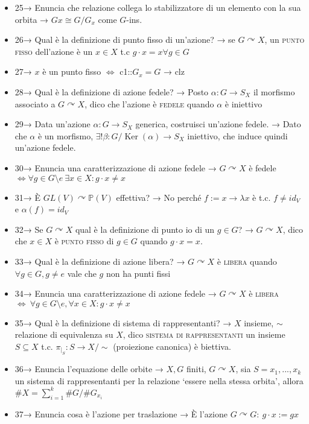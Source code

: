 \documentclass[A4,12pt]{article}
\newcommand{\acts}{\curvearrowright}
\newcommand{\Gins}{$ G $-ins.}
\renewcommand{\iff}{\Leftrightarrow}
\begin{document}
\begin{itemize}[noitemsep]
		\item 25→ Enuncia che relazione collega lo stabilizzatore di un elemento con la sua orbita → $ Gx \cong G/G_x $ come \Gins
		\item 26→ Qual è la definizione di punto fisso di un'azione? → se $G\acts X  $, un \textsc{punto fisso }dell'azione è un $ x\in X $ t.c $ g\cdot x = x \forall g\in G $
		\item 27→ $ x $ è un punto fisso $ \Leftrightarrow $ {{c1::$ G_x = G $ }}  → clz
		\item 28→ Qual è la definizione di azione fedele? → Posto $ \alpha:G \to S_X  $ il morfismo associato a $ G\acts X $, dico che l'azione è \textsc{fedele} quando $ \alpha $ è iniettivo
		\item 29→ Data un'azione $ \alpha :G\to S_X $ generica, costruisci un'azione fedele. → Dato che $ \alpha $ è un morfismo, $ \exists! \beta : G/\operatorname{Ker}(\alpha) \to S_X$ iniettivo, che induce quindi un'azione fedele.
		\item 30→ Enuncia una caratterizzazione di azione fedele → $ G\acts X $ è fedele $ \iff \forall g\in G\setminus{e}\ \exists x\in X : g\cdot x \neq x$
		\item 31→ È $ GL(V)\acts \mathbb{P}(V) $ effettiva? → No perché $ f := x\to\lambda x $ è t.c. $ f\neq id_V $ e $ \alpha(f) = id_V $
		\item 32→ Se $ G\acts X $ qual è la definizione di punto io di un $ g\in G $? → $ G\acts X $, dico che $ x\in X $ è \textsc{punto fisso} di $ g\in G $ quando $ g\cdot x = x $.
		\item 33→ Qual è la definizione di azione libera? → $ G\acts X $ è \textsc{libera} quando $ \forall g\in G, g\neq e$ vale che  $ g$ non ha punti fissi 
		\item 34→ Enuncia una caratterizzazione di azione fedele → $ G\acts X $ è \textsc{libera} $ \iff\ \forall g\in G\setminus{e}, \forall x\in X: g\cdot x \neq x $ 
		\item 35→ Qual è la definizione di sistema di rappresentanti? → $ X $ insieme, $ \sim  $ relazione di equivalenza su $ X $, dico \textsc{sistema di rappresentanti} un insieme $ S\subseteq X $ t.c. $ \pi_{|_{S}}:S\to X/\sim $ (proiezione canonica) è biettiva.
		\item 36→ Enuncia l'equazione delle orbite → $ X,G $ finiti, $ G\acts X $, sia $ S={x_1,...,x_k} $ un sistema di rappresentanti per la relazione \enquote*{essere nella stessa orbita}, allora $ \#X = \sum_{i=1}^k \#G/\#G_{x_i} $
		\item 37→ Enuncia cosa è l'azione per traslazione → È l'azione $ G\acts G:\ g\cdot x:= gx $

\end{itemize}
\end{document}
